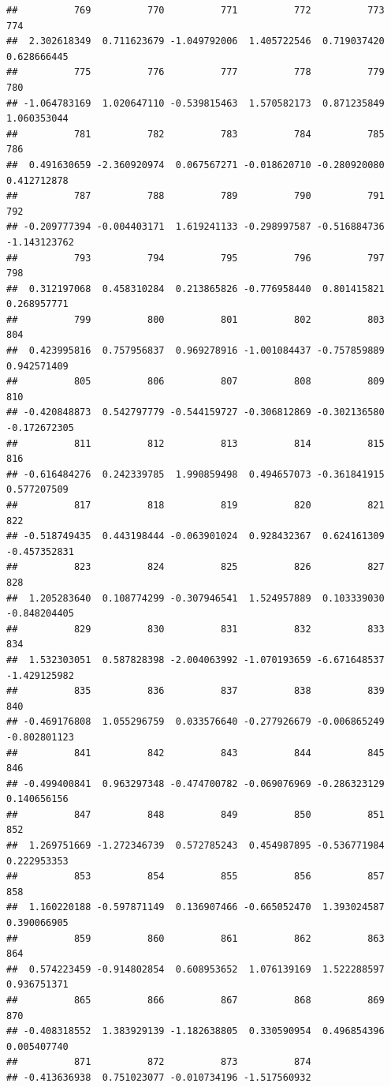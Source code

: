 \documentclass[
]{article}
\begin{document}
\begin{verbatim}
##          769          770          771          772          773          774 
##  2.302618349  0.711623679 -1.049792006  1.405722546  0.719037420  0.628666445 
##          775          776          777          778          779          780 
## -1.064783169  1.020647110 -0.539815463  1.570582173  0.871235849  1.060353044 
##          781          782          783          784          785          786 
##  0.491630659 -2.360920974  0.067567271 -0.018620710 -0.280920080  0.412712878 
##          787          788          789          790          791          792 
## -0.209777394 -0.004403171  1.619241133 -0.298997587 -0.516884736 -1.143123762 
##          793          794          795          796          797          798 
##  0.312197068  0.458310284  0.213865826 -0.776958440  0.801415821  0.268957771 
##          799          800          801          802          803          804 
##  0.423995816  0.757956837  0.969278916 -1.001084437 -0.757859889  0.942571409 
##          805          806          807          808          809          810 
## -0.420848873  0.542797779 -0.544159727 -0.306812869 -0.302136580 -0.172672305 
##          811          812          813          814          815          816 
## -0.616484276  0.242339785  1.990859498  0.494657073 -0.361841915  0.577207509 
##          817          818          819          820          821          822 
## -0.518749435  0.443198444 -0.063901024  0.928432367  0.624161309 -0.457352831 
##          823          824          825          826          827          828 
##  1.205283640  0.108774299 -0.307946541  1.524957889  0.103339030 -0.848204405 
##          829          830          831          832          833          834 
##  1.532303051  0.587828398 -2.004063992 -1.070193659 -6.671648537 -1.429125982 
##          835          836          837          838          839          840 
## -0.469176808  1.055296759  0.033576640 -0.277926679 -0.006865249 -0.802801123 
##          841          842          843          844          845          846 
## -0.499400841  0.963297348 -0.474700782 -0.069076969 -0.286323129  0.140656156 
##          847          848          849          850          851          852 
##  1.269751669 -1.272346739  0.572785243  0.454987895 -0.536771984  0.222953353 
##          853          854          855          856          857          858 
##  1.160220188 -0.597871149  0.136907466 -0.665052470  1.393024587  0.390066905 
##          859          860          861          862          863          864 
##  0.574223459 -0.914802854  0.608953652  1.076139169  1.522288597  0.936751371 
##          865          866          867          868          869          870 
## -0.408318552  1.383929139 -1.182638805  0.330590954  0.496854396  0.005407740 
##          871          872          873          874 
## -0.413636938  0.751023077 -0.010734196 -1.517560932
\end{verbatim}
\end{document}
